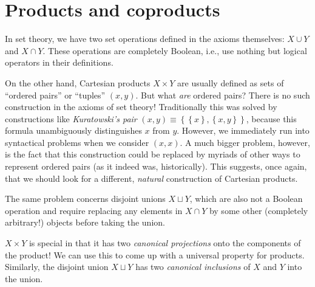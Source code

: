\section{Products and coproducts \label{Sec.Products}}

In set theory, we have two set operations defined in the axioms themselves:
$X\cup Y$ and $X\cap Y$. These operations are completely Boolean,
i.e., use nothing but logical operators in their definitions. 

On the other hand, Cartesian products $X\times Y$ are usually defined
as sets of ``ordered pairs'' or ``tuples'' $(x,y)$. But what
\emph{are} ordered pairs? There is no such construction in the axioms of
set theory! Traditionally this was solved by constructions like \emph{Kuratowski's
pair} $\left(x,y\right)\equiv\left\{ \left\{ x\right\} ,\left\{ x,y\right\} \right\} $,
because this formula unambiguously distinguishes $x$ from $y$. However,
we immediately run into syntactical problems when we consider $\left(x,x\right)$.
A much bigger problem, however, is the fact that this construction
could be replaced by myriads of other ways to represent ordered pairs
(as it indeed was, historically). This suggests, once again, that
we should look for a different, \emph{natural} construction of Cartesian
products.

The same problem concerns disjoint unions $X\sqcup Y$, which are
also not a Boolean operation and require replacing any elements in
$X\cap Y$ by some other (completely arbitrary!) objects before taking
the union.

$X\times Y$ is special in that it has two \emph{canonical projections}
onto the components of the product! We can use this to come up with
a universal property for products. Similarly, the disjoint union $X\sqcup Y$
has two \emph{canonical inclusions} of $X$ and $Y$ into the union.

